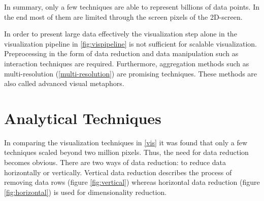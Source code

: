 In summary, only a few techniques are able to represent billions of data points. In the end most of them are limited through the screen pixels of the 2D-screen. 

In order to present large data effectively the visualization step alone in the visualization pipeline in \ref{fig:vispipeline} is not sufficient for scalable visualization. Preprocessing in the form of data reduction and data manipulation such as interaction techniques are required. Furthermore, aggregation methods such as multi-resolution (\ref{multi-resolution}) are promising techniques. These methods are also called advanced visual metaphors. 


\section{Analytical Techniques}\label{analytical}
In comparing the visualization techniques in \ref{vis} it was found that only a few techniques scaled beyond two million pixels. Thus, the need for data reduction becomes obvious. There are two ways of data reduction: to reduce data horizontally or vertically. 
Vertical data reduction describes the process of removing data rows (figure \ref{fig:vertical}) whereas horizontal data reduction (figure \ref{fig:horizontal}) is used for dimensionality reduction.



\begin{figure}[H]
 \centering
\qquad
\qquad
\end{figure}

